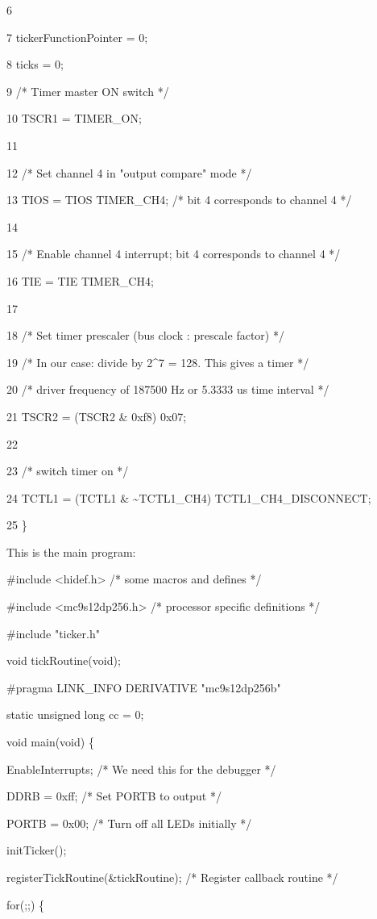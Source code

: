 6

7 tickerFunctionPointer = 0;

8 ticks = 0;

9 /* Timer master ON switch */

10 TSCR1 = TIMER\_ON;

11

12 /* Set channel 4 in "output compare" mode */

13 TIOS = TIOS \textbar{} TIMER\_CH4; /* bit 4 corresponds to channel 4
*/

14

15 /* Enable channel 4 interrupt; bit 4 corresponds to channel 4 */

16 TIE = TIE \textbar{} TIMER\_CH4;

17

18 /* Set timer prescaler (bus clock : prescale factor) */

19 /* In our case: divide by 2\^{}7 = 128. This gives a timer */

20 /* driver frequency of 187500 Hz or 5.3333 us time interval */

21 TSCR2 = (TSCR2 \& 0xf8) \textbar{} 0x07;

22

23 /* switch timer on */

24 TCTL1 = (TCTL1 \& \textasciitilde{}TCTL1\_CH4) \textbar{}
TCTL1\_CH4\_DISCONNECT;

25 \}

This is the main program:

\#include \textless{}hidef.h\textgreater{} /* some macros and defines */

\#include \textless{}mc9s12dp256.h\textgreater{} /* processor specific
definitions */

\#include "ticker.h"

void tickRoutine(void);

\#pragma LINK\_INFO DERIVATIVE "mc9s12dp256b"

static unsigned long cc = 0;

void main(void) \{

EnableInterrupts; /* We need this for the debugger */

DDRB = 0xff; /* Set PORTB to output */

PORTB = 0x00; /* Turn off all LEDs initially */

initTicker();

registerTickRoutine(\&tickRoutine); /* Register callback routine */

for(;;) \{

